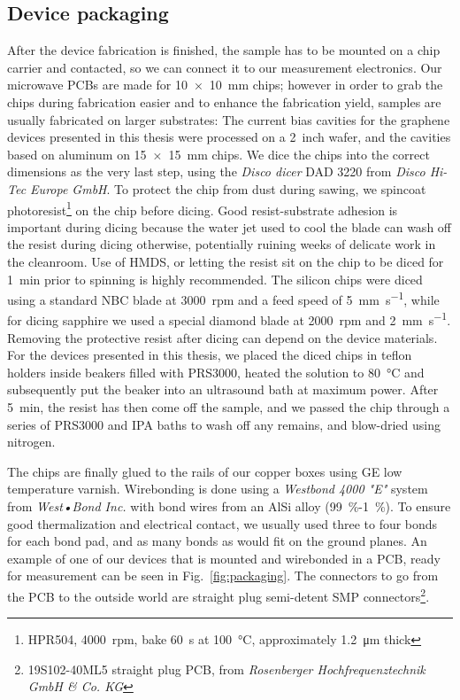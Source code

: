 \pagebreak
\subsection{Device packaging}\label{sec:fab-packaging}

% 
After the device fabrication is finished, the sample has to be mounted on a chip carrier and contacted, so we can connect it to our measurement electronics.
% 
Our microwave PCBs are made for \SI{10x10}{\milli\meter} chips; however in order to grab the chips during fabrication easier and to enhance the fabrication yield, samples are usually fabricated on larger substrates:
% 
The current bias cavities for the graphene devices presented in this thesis were processed on a \SI{2}{inch} wafer, and the cavities based on aluminum on \SI{15x15}{\milli\meter} chips.
% 
We dice the chips into the correct dimensions as the very last step, using the \textit{Disco dicer} DAD 3220 from \textit{Disco Hi-Tec Europe GmbH}.
% 
To protect the chip from dust during sawing, we spincoat photoresist\footnote{HPR504, \SI{4000}{rpm}, bake \SI{60}{\second} at \SI{100}{\celsius}, approximately \SI{1.2}{\micro\meter} thick} on the chip before dicing.
% 
Good resist-substrate adhesion is important during dicing because the water jet used to cool the blade can wash off the resist during dicing otherwise, potentially ruining weeks of delicate work in the cleanroom.
% 
Use of HMDS, or letting the resist sit on the chip to be diced for \SI{1}{\minute} prior to spinning is highly recommended.
% 
The silicon chips were diced using a standard NBC blade at \SI{3000}{rpm} and a feed speed of \SI{5}{\milli\meter\per\second}, while for dicing sapphire we used a special diamond blade at \SI{2000}{rpm} and \SI{2}{\milli\meter\per\second}.
% 
Removing the protective resist after dicing can depend on the device materials.
% 
For the devices presented in this thesis, we placed the diced chips in teflon holders inside beakers filled with PRS3000, heated the solution to \SI{80}{\celsius} and subsequently put the beaker into an ultrasound bath at maximum power.
% 
After \SI{5}{\minute}, the resist has then come off the sample, and we passed the chip through a series of PRS3000 and IPA baths to wash off any remains, and blow-dried using nitrogen.

% 
The chips are finally glued to the rails of our copper boxes using GE low temperature varnish.
% 
Wirebonding is done using a \textit{Westbond 4000 "E"} system from \textit{West•Bond Inc.} with bond wires from an AlSi alloy (\SI{99}{\percent}-\SI{1}{\percent}).
% 
To ensure good thermalization and electrical contact, we usually used three to four bonds for each bond pad, and as many bonds as would fit on the ground planes.
% 
An example of one of our devices that is mounted and wirebonded in a PCB, ready for measurement can be seen in Fig.~\ref{fig:packaging}.
% 
The connectors to go from the PCB to the outside world are straight plug semi-detent SMP connectors\footnote{19S102-40ML5 straight plug PCB, from \textit{Rosenberger Hochfrequenztechnik GmbH \& Co. KG}}.



